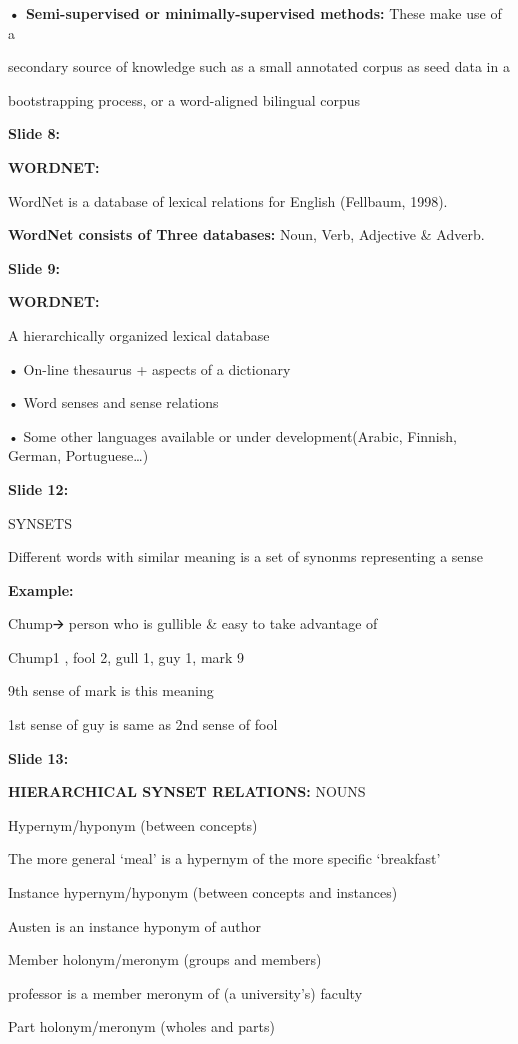 \documentclass[11pt,a4paper]{article}
\begin{document}
\textbf{• Semi-supervised or minimally-supervised methods:}  These make use of a

secondary source of knowledge such as a small annotated corpus as seed data in a

bootstrapping process, or a word-aligned bilingual corpus

\textbf{Slide 8:}

\textbf{WORDNET:} 

WordNet is a database of lexical relations for English (Fellbaum, 1998).

\textbf{WordNet consists of Three databases:}  Noun, Verb, Adjective \& Adverb.

\textbf{Slide 9:}

\textbf{WORDNET:} 

A hierarchically organized lexical database

• On-line thesaurus + aspects of a dictionary

• Word senses and sense relations

• Some other languages available or under development(Arabic, Finnish, German, Portuguese…)

\textbf{Slide 12:}

SYNSETS

Different words with similar meaning is a set of synonms representing a sense

\textbf{Example:} 

Chump🡪 person who is gullible & easy to take advantage of

{Chump1 , fool 2, gull 1, guy 1, mark 9}

9th sense of mark is this meaning

1st sense of guy is same as 2nd sense of fool

\textbf{Slide 13:}

\textbf{HIERARCHICAL SYNSET RELATIONS:}  NOUNS

Hypernym/hyponym (between concepts)

The more general ‘meal’ is a hypernym of the more specific ‘breakfast’

Instance hypernym/hyponym (between concepts and instances)

Austen is an instance hyponym of author

Member holonym/meronym (groups and members)

professor is a member meronym of (a university’s) faculty

Part holonym/meronym (wholes and parts)
\end{document}
